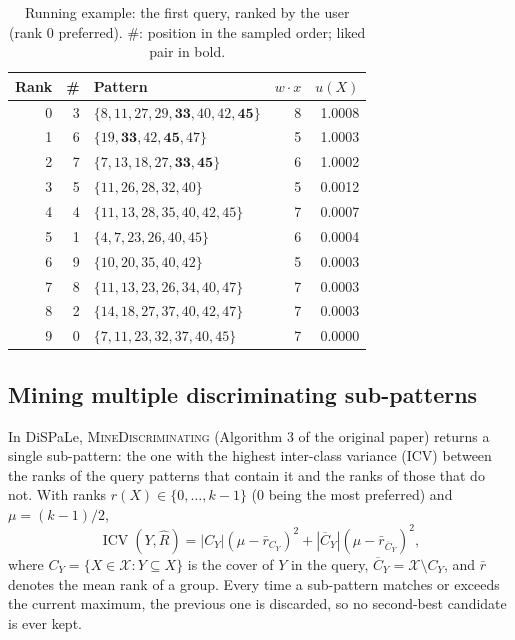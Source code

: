 \documentclass[sigconf]{acmart}
\newcommand{\ICV}{\operatorname{ICV}}
\begin{document}
\begin{table}[t]
\centering
\caption{Running example: the first query, ranked by the user (rank $0$ preferred). \#: position in the sampled order; liked pair in bold.}
\label{tab:ex_query}
\small
\setlength{\tabcolsep}{4pt}
\begin{tabular}{rrlrr}
\toprule
Rank & \# & Pattern & $w\cdot x$ & $u(X)$ \\
\midrule
0 & 3 & $\{8,11,27,29,\mathbf{33},40,42,\mathbf{45}\}$ & 8 & 1.0008 \\
1 & 6 & $\{19,\mathbf{33},42,\mathbf{45},47\}$          & 5 & 1.0003 \\
2 & 7 & $\{7,13,18,27,\mathbf{33},\mathbf{45}\}$        & 6 & 1.0002 \\
3 & 5 & $\{11,26,28,32,40\}$                            & 5 & 0.0012 \\
4 & 4 & $\{11,13,28,35,40,42,45\}$                      & 7 & 0.0007 \\
5 & 1 & $\{4,7,23,26,40,45\}$                           & 6 & 0.0004 \\
6 & 9 & $\{10,20,35,40,42\}$                            & 5 & 0.0003 \\
7 & 8 & $\{11,13,23,26,34,40,47\}$                      & 7 & 0.0003 \\
8 & 2 & $\{14,18,27,37,40,42,47\}$                      & 7 & 0.0003 \\
9 & 0 & $\{7,11,23,32,37,40,45\}$                       & 7 & 0.0000 \\
\bottomrule
\end{tabular}
\end{table}

\subsection{Mining multiple discriminating sub-patterns}
In DiSPaLe, \textsc{MineDiscriminating} (Algorithm 3 of the original paper) returns a single sub-pattern: the one with the highest inter-class variance (ICV) between the ranks of the query patterns that contain it and the ranks of those that do not. With ranks $r(X)\in\{0,\ldots,k-1\}$ ($0$ being the most preferred) and $\mu=(k-1)/2$,
\begin{equation}\label{eq:icv}
\ICV(Y,\hat R)=|C_Y|(\mu-\bar r_{C_Y})^2+|\overline C_Y|(\mu-\bar r_{\overline C_Y})^2,
\end{equation}
where $C_Y=\{X\in\mathcal X:Y\subseteq X\}$ is the cover of $Y$ in the query, $\overline C_Y=\mathcal X\setminus C_Y$, and $\bar r$ denotes the mean rank of a group. Every time a sub-pattern matches or exceeds the current maximum, the previous one is discarded, so no second-best candidate is ever kept.
\end{document}
